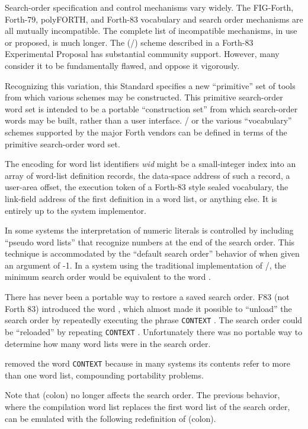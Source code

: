 Search-order specification and control mechanisms vary widely. The
FIG-Forth, Forth-79, polyFORTH, and Forth-83 vocabulary and search
order mechanisms are all mutually incompatible. The complete list of
incompatible mechanisms, in use or proposed, is much longer. The
(/) scheme described in a Forth-83 Experimental
Proposal has substantial community support. However, many consider it
to be fundamentally flawed, and oppose it vigorously.

Recognizing this variation, this Standard specifies a new ``primitive''
set of tools from which various schemes may be constructed. This
primitive search-order word set is intended to be a portable
``construction set'' from which search-order words may be built,
rather than a user interface. / or the various
``vocabulary'' schemes supported by the major Forth vendors can be
defined in terms of the primitive search-order word set.

The encoding for word list identifiers \emph{wid} might be a
small-integer index into an array of word-list definition records, the
data-space address of such a record, a user-area offset, the execution
token of a Forth-83 style sealed vocabulary, the link-field address of
the first definition in a word list, or anything else. It is entirely
up to the system implementor.

In some systems the interpretation of numeric literals is controlled
by including ``pseudo word lists'' that recognize numbers at the end
of the search order. This technique is accommodated by the ``default
search order'' behavior of  when given an argument of
-1. In a system using the traditional implementation of
/, the minimum search order would be equivalent
to the word .

There has never been a portable way to restore a saved search order.
F83 (not Forth 83) introduced the word , which almost
made it possible to ``unload'' the search order by repeatedly executing
the phrase \texttt{CONTEXT}  . The search
order could be ``reloaded'' by repeating  \texttt{CONTEXT}
\word{!}. Unfortunately there was no portable way to determine
how many word lists were in the search order.

 removed the word \texttt{CONTEXT} because in many systems
its contents refer to more than one word list, compounding portability
problems.

Note that \word{:} (colon) no longer affects the search order. The
previous behavior, where the compilation word list replaces the first
word list of the search order, can be emulated with the following
redefinition of \word{:} (colon).

